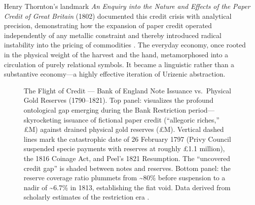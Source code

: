 \documentclass[
]{article}
\makeatletter
\newcommand*\pandocbounded[1]{%
  \sbox\pandoc@box{#1}%
  \Gscale@div\@tempa{\textheight}{\dimexpr\ht\pandoc@box+\dp\pandoc@box\relax}%
  \Gscale@div\@tempb{\linewidth}{\wd\pandoc@box}%
  \ifdim\@tempb\p@<\@tempa\p@\let\@tempa\@tempb\fi%
  \ifdim\@tempa\p@<\p@\scalebox{\@tempa}{\usebox\pandoc@box}%
  \else\usebox{\pandoc@box}%
  \fi%
}
\makeatother
\begin{document}
Henry Thornton's landmark \emph{An Enquiry into the Nature and Effects
of the Paper Credit of Great Britain} (1802) documented this credit
crisis with analytical precision, demonstrating how the expansion of
paper credit operated independently of any metallic constraint and
thereby introduced radical instability into the pricing of commodities
\citep{thornton1802nature}. The everyday economy, once rooted in the
physical weight of the harvest and the hand, metamorphosed into a
circulation of purely relational symbols. It became a linguistic rather
than a substantive economy---a highly effective iteration of Urizenic
abstraction.

\begin{figure}
\centering
\pandocbounded{\includegraphics[keepaspectratio,alt={The Flight of Credit --- Bank of England Note Issuance vs.~Physical Gold Reserves (1790--1821). Top panel: visualizes the profound ontological gap emerging during the Bank Restriction period---skyrocketing issuance of fictional paper credit (``allegoric riches,'' £M) against drained physical gold reserves (£M). Vertical dashed lines mark the catastrophic date of 26 February 1797 (Privy Council suspended specie payments with reserves at roughly £1.1 million), the 1816 Coinage Act, and Peel's 1821 Resumption. The ``uncovered credit gap'' is shaded between notes and reserves. Bottom panel: the reserve coverage ratio plummets from \textasciitilde80\% before suspension to a nadir of \textasciitilde6.7\% in 1813, establishing the fiat void. Data derived from scholarly estimates of the restriction era {[}@clapham1944bank; @tooke1838history{]}.}]{../figures/historic_reserves_dark.pdf}}
\caption{The Flight of Credit --- Bank of England Note Issuance
vs.~Physical Gold Reserves (1790--1821). Top panel: visualizes the
profound ontological gap emerging during the Bank Restriction
period---skyrocketing issuance of fictional paper credit (``allegoric
riches,'' £M) against drained physical gold reserves (£M). Vertical
dashed lines mark the catastrophic date of 26 February 1797 (Privy
Council suspended specie payments with reserves at roughly £1.1
million), the 1816 Coinage Act, and Peel's 1821 Resumption. The
``uncovered credit gap'' is shaded between notes and reserves. Bottom
panel: the reserve coverage ratio plummets from \textasciitilde80\%
before suspension to a nadir of \textasciitilde6.7\% in 1813,
establishing the fiat void. Data derived from scholarly estimates of the
restriction era
\citep{clapham1944bank, tooke1838history}.}\label{fig-historic-reserves}
\end{figure}
\end{document}
